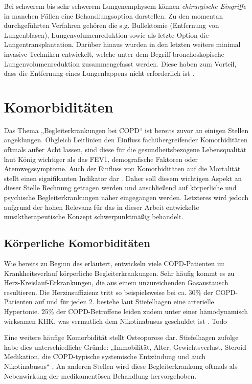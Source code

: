 Bei schwerem bis sehr schwerem Lungenemphysem können \emph{chirurgische Eingriffe} in manchen Fällen eine Behandlungsoption darstellen. Zu den momentan durchgeführten Verfahren gehören die s.g. Bullektomie (Entfernung von Lungenblasen), Lungenvolumenreduktion sowie als letzte Option die Lungentransplantation. Darüber hinaus wurden in den letzten weitere minimal invasive Techniken entwickelt, welche unter dem Begriff bronchoskopische Lungenvolumenreduktion zusammengefasst werden. Diese haben zum Vorteil, dass die Entfernung eines Lungenlappens nicht erforderlich ist \autocite[vgl.][e23]{vogelmeier2007}.

\section{Komorbiditäten}
\label{komorbiditaeten}
Das Thema „Begleiterkrankungen bei COPD“ ist bereits zuvor an einigen Stellen angeklungen. Obgleich Leitlinien den Einfluss fachübergreifender Komorbiditäten oftmals außer Acht lassen, sind diese für die gesundheitsbezogene Lebensqualität laut König wichtiger als das FEV1, demografische Faktoren oder Atemwegssymptome. Auch der Einfluss von Komorbiditäten auf die Mortalität stellt einen signifikanten Indikator dar \autocite[vgl.][395]{koenig2007}.
Daher soll diesem wichtigen Aspekt an dieser Stelle Rechnung getragen werden und anschließend auf körperliche und psychische Begleiterkrankungen näher eingegangen werden. Letzteres wird jedoch aufgrund der hohen Relevanz für das in dieser Arbeit entwickelte musiktherapeutische Konzept schwerpunktmäßig behandelt.


\subsection{Körperliche Komorbiditäten}
Wie bereits zu Beginn des \label{COPD} erläutert, entwickeln viele COPD-Patienten im Krankheitsverlauf körperliche Begleiterkrankungen. Sehr häufig kommt es zu Herz-Kreislauf-Erkrankungen, die aus einem unzureichenden Gasaustausch resultieren. Die Herzinsuffizienz tritt so beispielsweise bei ca. 30\% der COPD-Patienten auf und für jeden 2. bestehe laut Stiefelhagen eine arterielle Hypertonie. 25\% der COPD-Betroffene leiden zudem unter einer hämodynamisch wirksamen KHK, was vermutlich dem Nikotinabusus geschuldet ist \autocite[vgl.][37]{stiefelhagen2013}. Todo

Eine weitere häufige Komorbidität stellt Osteoporose dar. Stiefelhagen zufolge habe dies unterschiedliche Gründe: „Immobilität, Alter, Gewichtsverlust, Steroid-Medikation, die COPD-typische systemische Entzündung und auch Nikotinabusus“ \autocite[37]{stiefelhagen2013}. An anderen Stellen wird diese Begleiterkrankung oftmals als Nebenwirkung der medikamentösen Behandlung hervorgehoben. 

